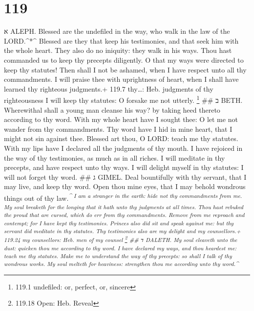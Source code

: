 \hypertarget{section-118}{%
\subsection{}\label{section-118}}

\hypertarget{section-119}{%
\section{119}\label{section-119}}

א ALEPH.  Blessed are the undefiled in the way, who walk in
the law of the LORD.\^{}*\^{}  Blessed are they that keep
his testimonies, and that seek him with the whole heart. 
They also do no iniquity: they walk in his ways.  Thou hast
commanded us to keep thy precepts diligently.  O that my
ways were directed to keep thy statutes!  Then shall I not
be ashamed, when I have respect unto all thy commandments. 
I will praise thee with uprightness of heart, when I shall have learned
thy righteous judgments.+ 119.7 thy\ldots: Heb. judgments of thy
righteousness  I will keep thy statutes: O forsake me not
utterly. \footnote{119.1 undefiled: or, perfect, or, sincere} \#\# ב
BETH.  Wherewithal shall a young man cleanse his way? by
taking heed thereto according to thy word.  With my whole
heart have I sought thee: O let me not wander from thy commandments.
 Thy word have I hid in mine heart, that I might not sin
against thee.  Blessed art thou, O LORD: teach me thy
statutes.  With my lips have I declared all the judgments
of thy mouth.  I have rejoiced in the way of thy
testimonies, as much as in all riches.  I will meditate in
thy precepts, and have respect unto thy ways.  I will
delight myself in thy statutes: I will not forget thy word. \#\# ג
GIMEL.  Deal bountifully with thy servant, that I may live,
and keep thy word.  Open thou mine eyes, that I may behold
wondrous things out of thy law.\textsuperscript{\emph{\^{} 
I am a stranger in the earth: hide not thy commandments from me.
 My soul breaketh for the longing that it hath unto thy
judgments at all times.  Thou hast rebuked the proud that
are cursed, which do err from thy commandments.  Remove
from me reproach and contempt; for I have kept thy testimonies.
 Princes also did sit and speak against me: but thy servant
did meditate in thy statutes.  Thy testimonies also are my
delight and my counsellors.+ 119.24 my counsellors: Heb. men of my
counsel \footnote{119.18 Open: Heb. Reveal} \#\# ד DALETH. 
My soul cleaveth unto the dust: quicken thou me according to thy word.
 I have declared my ways, and thou heardest me: teach me
thy statutes.  Make me to understand the way of thy
precepts: so shall I talk of thy wondrous works.  My soul
melteth for heaviness: strengthen thou me according unto thy word.\^{}}}
